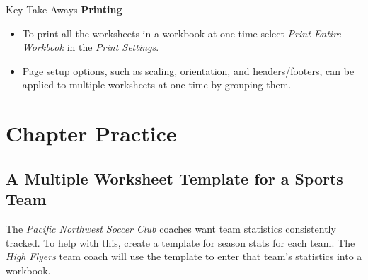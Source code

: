 \begin{center}
	\begin{tkwbox}{Key Take-Aways}
		\textbf{Printing}
		\\
		\begin{itemize}
			\setlength{\itemsep}{0pt}
			\setlength{\parskip}{0pt}
			\setlength{\parsep}{0pt}
			
			\item To print all the worksheets in a workbook at one time select \textit{Print Entire Workbook} in the \textit{Print Settings}.
			\item Page setup options, such as scaling, orientation, and headers/footers, can be applied to multiple worksheets at one time by grouping them.
			
		\end{itemize}
	\end{tkwbox}
\end{center}

\section{Chapter Practice}

\subsection{A Multiple Worksheet Template for a Sports Team}

The \textit{Pacific Northwest Soccer Club} coaches want team statistics consistently tracked. To help with this, create a template for season stats for each team. The \textit{High Flyers} team coach will use the template to enter that team's statistics into a workbook.

